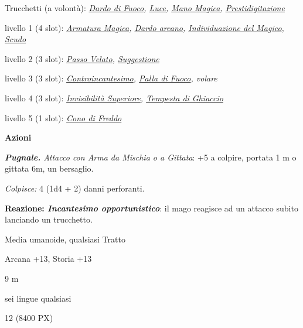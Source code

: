 \begin{multicols}{2}
{Trucchetti (a volontà): \emph{\hyperlink{Dardo di Fuoco}{Dardo di Fuoco}, \hyperlink{Luce}{Luce}, \hyperlink{Mano Magica}{Mano Magica}, \hyperlink{Prestidigitazione}{Prestidigitazione}}

livello 1 (4 slot): \emph{\hyperlink{Armatura Magica}{Armatura Magica}, \hyperlink{Dardo arcano}{Dardo arcano}, \hyperlink{Individuazione del Magico}{Individuazione del Magico}, \hyperlink{Scudo}{Scudo}}

livello 2 (3 slot): \emph{\hyperlink{Passo Velato}{Passo Velato}, \hyperlink{Suggestione}{Suggestione}}

livello 3 (3 slot): \emph{\hyperlink{Controincantesimo}{Controincantesimo}, \hyperlink{Palla di Fuoco}{Palla di Fuoco}, volare}

livello 4 (3 slot): \emph{\hyperlink{Invisibilità Superiore}{Invisibilità Superiore}, \hyperlink{Tempesta di Ghiaccio}{Tempesta di Ghiaccio}}

livello 5 (1 slot): \emph{\hyperlink{Cono di Freddo}{Cono di Freddo}}

\textbf{Azioni}

\emph{\textbf{Pugnale.} Attacco con Arma da Mischia o a Gittata}: +5 a colpire, portata 1 m o gittata 6m, un bersaglio.

\emph{Colpisce:} 4 (1d4 + 2) danni perforanti.

\textbf{Reazione: \emph{Incantesimo opportunistico}}: il mago reagisce ad un attacco subito lanciando un trucchetto.

\begin{description}[noitemsep, topsep=0pt, parsep=0pt, partopsep=0pt, itemsep=1pt, leftmargin=2.35cm,  labelwidth=2.2cm, itemindent=0cm, listparindent=0pt] %
\setlength{\baselineskip}{10pt}
\item[\textbf{Taglia/Tipo}] Media umanoide, qualsiasi Tratto
\item[\textbf{Caratt.}] 
\item[\textbf{Punti Ferita}] 
\item[\textbf{Comp.}] Arcana +13, Storia +13
\item[\textbf{Tiri Salvez.}] 
\item[\textbf{Movimento}] 9 m
\item[\textbf{Linguaggi}] sei lingue qualsiasi
\item[\textbf{Sfida}] 12 (8400 PX)
\end{description}
\smallskip

}
\end{multicols}

